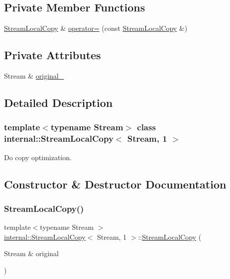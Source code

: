 \subsection*{Private Member Functions}
\begin{DoxyCompactItemize}
\item 
\hyperlink{classinternal_1_1StreamLocalCopy}{Stream\+Local\+Copy} \& \hyperlink{classinternal_1_1StreamLocalCopy_3_01Stream_00_011_01_4_ac2b9afa416fa4fc2a37156445902bfc3}{operator=} (const \hyperlink{classinternal_1_1StreamLocalCopy}{Stream\+Local\+Copy} \&)
\end{DoxyCompactItemize}
\subsection*{Private Attributes}
\begin{DoxyCompactItemize}
\item 
Stream \& \hyperlink{classinternal_1_1StreamLocalCopy_3_01Stream_00_011_01_4_a95cf773c6d96bb2c862cec8d1b54d658}{original\+\_\+}
\end{DoxyCompactItemize}


\subsection{Detailed Description}
\subsubsection*{template$<$typename Stream$>$\newline
class internal\+::\+Stream\+Local\+Copy$<$ Stream, 1 $>$}

Do copy optimization. 

\subsection{Constructor \& Destructor Documentation}
\mbox{\label{classinternal_1_1StreamLocalCopy_3_01Stream_00_011_01_4_aba475fed3eecc9f77ff059fdb7fe2a32}} 
\subsubsection{\texorpdfstring{Stream\+Local\+Copy()}{StreamLocalCopy()}}
{\footnotesize\ttfamily template$<$typename Stream $>$ \\
\hyperlink{classinternal_1_1StreamLocalCopy}{internal\+::\+Stream\+Local\+Copy}$<$ Stream, 1 $>$\+::\hyperlink{classinternal_1_1StreamLocalCopy}{Stream\+Local\+Copy} (\begin{DoxyParamCaption}\item[{Stream \&}]{original }\end{DoxyParamCaption})\hspace{0.3cm}{\ttfamily [inline]}}

